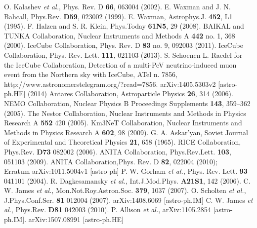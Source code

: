 \begin{thebibliography}{1}
 O. Kalashev {\it et al.}, Phys. Rev. D \textbf{66}, 063004 (2002).
 E. Waxman and J. N. Bahcall, Phys.Rev. \textbf{D59},  023002 (1999).
  E. Waxman,  Astrophys.J. \textbf{452},  L1 (1995).
 F. Halzen and S. R. Klein, Phys.Today \textbf{61N5}, 29 (2008).
 BAIKAL and TUNKA Collaboration, Nuclear Instruments and Methods A \textbf{442} no. 1, 368 (2000).
 IceCube Collaboration, Phys. Rev. D \textbf{83} no. 9,  092003 (2011).
 IceCube Collaboration, Phys. Rev. Lett. \textbf{111}, 021103 (2013).
 S. Schoenen L. Raedel for the IceCube Collaboration, Detection of a multi-PeV neutrino-induced muon event from the Northern sky with IceCube, ATel n. 7856, http://www.astronomerstelegram.org/?read=7856.
 arXiv:1405.5303v2 [astro-ph.HE] (2014)
 Antares Collaboration, Astroparticle Physics \textbf{26}, 314 (2006).
 NEMO Collaboration, Nuclear Physics B Proceedings Supplements \textbf{143},  359–362 (2005).
  The Nestor Collaboration,  Nuclear Instruments and Methods in Physics Research A \textbf{552} 420 (2005).
  Km3NeT Collaboration, Nuclear Instruments and Methods in Physics Research A \textbf{602}, 98 (2009).
  G. A. Askar’yan, Soviet Journal of Experimental and Theoretical Physics \textbf{21}, 658 (1965).
 RICE Collaboration, Phys.Rev. \textbf{D73}  082002 (2006).
 ANITA Collaboration, Phys.Rev.Lett. \textbf{103},  051103 (2009).
ANITA Collaboration,Phys. Rev. D \textbf{82}, 022004 (2010);\\
Erratum arXiv:1011.5004v1 [astro-ph]
  P. W. Gorham {\it et al.},  Phys. Rev. Lett. \textbf{93}  041101 (2004).
 R. Dagkesamansky {\it et al.}, Int.J.Mod.Phys. \textbf{A21S1},  142 (2006).
 C. W. James {\it et al.}, Mon.Not.Roy.Astron.Soc. \textbf{379}, 1037 (2007).
  O. Scholten {\it et al.}, J.Phys.Conf.Ser. \textbf{81}  012004 (2007).
 arXiv:1408.6069 [astro-ph.IM]
  C. W. James {\it et al.}, Phys.Rev. \textbf{D81}  042003 (2010).
 P. Allison {\it et al.}, arXiv:1105.2854 [astro-ph.IM].
 arXiv:1507.08991 [astro-ph.HE]

\end{thebibliography}
